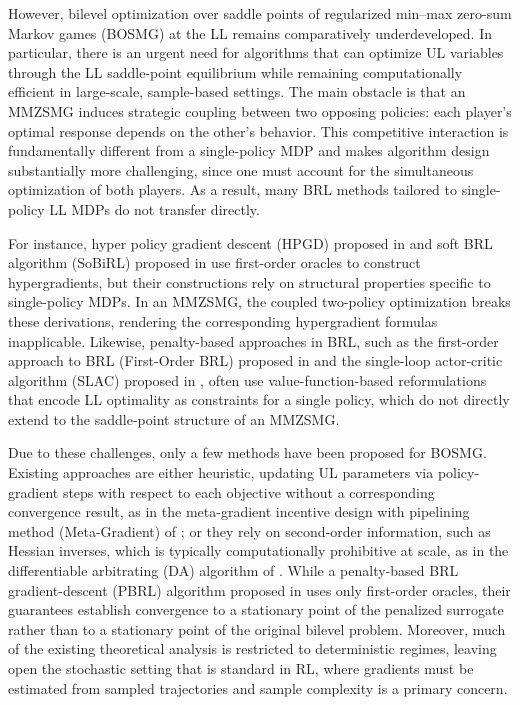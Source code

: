 \documentclass{article}
\theoremstyle{plain}
\theoremstyle{definition}
\theoremstyle{remark}
\begin{document}
\vspace{-1mm}
However, bilevel optimization over saddle points of regularized min--max zero-sum Markov games (BOSMG) at the LL remains comparatively underdeveloped. In particular, there is an urgent need for algorithms that can optimize UL variables through the LL saddle-point equilibrium while remaining computationally efficient in large-scale, sample-based settings. The main obstacle is that an MMZSMG induces strategic coupling between two opposing policies: each player’s optimal response depends on the other’s behavior. This competitive interaction is fundamentally different from a single-policy MDP and makes algorithm design substantially more challenging, since one must account for the simultaneous optimization of both players. As a result, many BRL methods tailored to single-policy LL MDPs do not transfer directly.

\vspace{-1mm}
For instance, hyper policy gradient descent (HPGD) proposed in \citet{thoma2024contextual} and soft BRL algorithm (SoBiRL) proposed in \citet{yang2025bilevel} use first-order oracles to construct hypergradients, but their constructions rely on structural properties specific to single-policy MDPs. In an MMZSMG, the coupled two-policy optimization breaks these derivations, rendering the corresponding hypergradient formulas inapplicable. Likewise, penalty-based approaches in BRL, such as the first-order approach to BRL (First-Order BRL)  proposed in \citet{gaur2025on} and the single-loop actor-critic algorithm (SLAC) proposed in \citet{zeng2025regularized}, often use value-function-based reformulations that encode LL optimality as constraints for a single policy, which do not directly extend to the saddle-point structure of an MMZSMG.

\vspace{-1mm}
Due to these challenges, only a few methods have been proposed for BOSMG. Existing approaches are either heuristic, updating UL parameters via policy-gradient steps with respect to each objective without a corresponding convergence result, as in the meta-gradient incentive design with pipelining method (Meta-Gradient) of \citet{yang2022adaptive}; or they rely on second-order information, such as Hessian inverses, which is typically computationally prohibitive at scale, as in the differentiable arbitrating (DA) algorithm of \citet{wang2023differentiable}. While a penalty-based BRL gradient-descent (PBRL) algorithm proposed in \citet{shen2025principled} uses only first-order oracles, their guarantees establish convergence to a stationary point of the penalized surrogate rather than to a stationary point of the original bilevel problem. Moreover, much of the existing theoretical analysis is restricted to deterministic regimes, leaving open the stochastic setting that is standard in RL, where gradients must be estimated from sampled trajectories and sample complexity is a primary concern.
\end{document}
